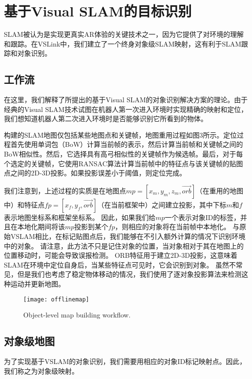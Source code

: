 \section{基于Visual SLAM的目标识别}
SLAM被认为是实现更真实AR体验的关键技术之一，因为它提供了对环境的理解和跟踪。在VSLink中，我们建立了一个终身对象级SLAM映射，这有利于SLAM跟踪和对象识别。

\subsection{\textbf{工作流}}
在这里，我们解释了所提出的基于Visual SLAM的对象识别解决方案的理论。由于经典的Visual SLAM\cite{mur2017orb,engel2014lsd}技术试图在机器人第一次进入环境时实现精确的映射和定位，我们想知道机器人第二次进入环境时是否能够识别它所看到的物体。

构建的SLAM地图\cite{mur2017orb}仅包括某些地图点和关键帧，地图重用过程如图3所示。定位过程首先使用单词包（BoW）\cite{galvez2012bags}计算当前帧的表示，然后计算当前帧和关键帧之间的BoW相似性。然后，它选择具有高弓相似性的关键帧作为候选帧。最后，对于每个选定的关键帧，它使用RANSAC\cite{derpanis2010overview}算法计算当前帧中的特征点与该关键帧的贴图点之间的2D-3D投影。如果投影误差小于阈值，则定位完成。

我们注意到，上述过程的实质是在地图点$mp = [x_m,y_m,z_m,\vec{orb}]$（在重用的地图中）和特征点$fp = [x_f,y_f,\vec{orb}]$（在当前框架中）之间建立投影，其中下标$m$和$f$表示地图坐标系和框架坐标系。
因此，如果我们给$mp$一个表示对象ID的标签，并且在本地化期间将该$mp$投影到某个$fp$，则相应的对象将在当前帧中本地化。
与原始VSLAM相比，在标记贴图点后，我们能够在不引入额外计算的情况下识别环境中的对象。
请注意，此方法不只是记住对象的位置，当对象相对于其在地图上的位置移动时，可能会导致误报检测。
ORB特征用于建立2D-3D投影，这意味着SLAM在环境中定位自身后，当某些特征点可见时，它会识别到对象。
虽然不常见，但是我们也考虑了稳定物体移动的情况，我们使用了逐对象投影算法来检测这种运动并更新地图。


\begin{figure}[t]
	\centering
	\texttt{[image: offlinemap]}
	\caption{Object-level map building workflow.}
	\label{fig:offlinemap}
\end{figure}

\subsection{\textbf{对象级地图}}\label{subsec:map}
为了实现基于VSLAM的对象识别，我们需要用相应的对象ID标记映射点。因此，我们称之为对象级映射。

